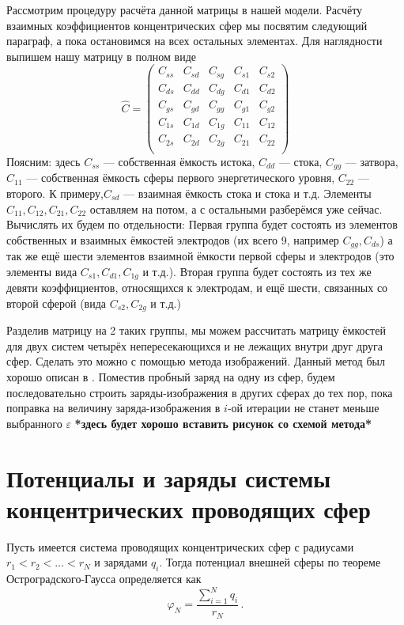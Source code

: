 \documentclass[12pt,a4paper]{report}
\begin{document}
Рассмотрим процедуру расчёта данной матрицы в нашей модели. Расчёту взаимных коэффициентов концентрических сфер мы посвятим следующий параграф, а пока остановимся на всех остальных элементах.
Для наглядности выпишем нашу матрицу в полном виде
\begin{equation}
\hat C = \begin{pmatrix}
C_{ss}& C_{sd}& C_{sg}& C_{s1}& C_{s2}\\
C_{ds}& C_{dd}& C_{dg}& C_{d1}& C_{d2}\\
C_{gs}& C_{gd}& C_{gg}& C_{g1}& C_{g2}\\
C_{1s}& C_{1d}& C_{1g}& C_{11}& C_{12}\\
C_{2s}& C_{2d}& C_{2g}& C_{21}& C_{22}\\
\end{pmatrix}
\end{equation}
Поясним: здесь $C_{ss}$ — собственная ёмкость истока, $C_{dd}$ — стока, $C_{gg}$ — затвора, $C_{11}$ — собственная ёмкость сферы первого энергетического уровня, $C_{22}$ — второго. К примеру,$C_{sd}$ — взаимная ёмкость стока и стока и т.д. Элементы $C_{11}, C_{12}, C_{21}, C_{22}$ оставляем на потом, а с остальными разберёмся уже сейчас. Вычислять их будем по отдельности: Первая группа будет состоять из элементов собственных и взаимных ёмкостей электродов (их всего 9, например $C_{gg}, C_{ds}$) а так же ещё шести элементов взаимной ёмкости первой сферы и электродов (это элементы вида $C_{s1}, C_{d1}, C_{1g}$ и т.д.). Вторая группа будет состоять из тех же девяти коэффициентов, относящихся к электродам, и ещё шести, связанных со второй сферой (вида $C_{s2}, C_{2g}$ и т.д.)

Разделив матрицу на 2 таких группы, мы можем рассчитать матрицу ёмкостей для двух систем четырёх непересекающихся и не лежащих внутри друг друга сфер. Сделать это можно с помощью метода изображений. Данный метод был хорошо описан в \cite{Landau}. Поместив пробный заряд на одну из сфер, будем последовательно строить заряды-изображения в других сферах до тех пор, пока поправка на величину заряда-изображения в $i$-ой итерации не станет меньше выбранного $\varepsilon$
\textbf{*здесь будет хорошо вставить рисунок со схемой метода*}
\section{Потенциалы и заряды системы концентрических проводящих сфер}

Пусть имеется система проводящих концентрических сфер с радиусами 
$r_1<r_2<\dots<r_N$ и зарядами $q_i$. Тогда потенциал внешней сферы по теореме 
Остроградского-Гаусса определяется как
\begin{equation}
  \varphi_N=\frac{\sum\limits_{i=1}^Nq_i}{r_N}\,.
\end{equation}
\end{document}
